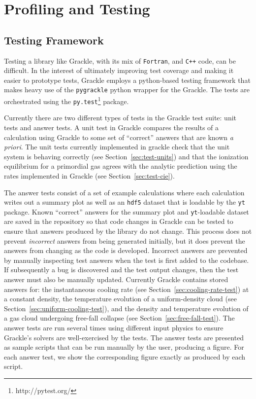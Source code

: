 \section{Profiling and Testing}
\label{sec:profiling-and-testing}



\subsection{Testing Framework}
\label{sec:testing}

Testing a library like Grackle, with its mix of \texttt{Fortran}, and
\texttt{C++} code, can be difficult. In the interest of ultimately improving
test coverage and making it easier to prototype tests, Grackle employs a
python-based testing framework that makes heavy use of the \texttt{pygrackle}
python wrapper for the Grackle. The tests are orchestrated using the
\texttt{py.test}\footnote{http://pytest.org/} package.

Currently there are two different types of tests in the Grackle test suite: unit
tests and answer tests. A unit test in Grackle compares the results of a
calculation using Grackle to some set of ``correct'' answers that are known
\textit{a priori}. The unit tests currently implemented in grackle check that the
unit system is behaving correctly (see Section~\ref{sec:test-units}) and that the
ionization equilibrium for a primordial gas agrees with the analytic prediction
using the rates implemented in Grackle (see Section~\ref{sec:test-cie}).

The answer tests consist of a set of example calculations where each calculation
writes out a summary plot as well as an \texttt{hdf5} dataset that is loadable
by the \texttt{yt} package. Known ``correct'' answers for the summary plot and
\texttt{yt}-loadable dataset are saved in the repository so that code changes in
Grackle can be tested to ensure that answers produced by the library do not
change. This process does not prevent \textit{incorrect} answers from being
generated initially, but it does prevent the answers from changing as the code
is developed. Incorrect answers are prevented by manually inspecting test
answers when the test is first added to the codebase. If subsequently a bug is
discovered and the test output changes, then the test answer must also be
manually updated. Currently Grackle contains stored answers for: the
instantaneous cooling rate (see Section~\ref{sec:cooling-rate-test})
at a constant density, the temperature evolution of a uniform-density cloud (see
Section~\ref{sec:uniform-cooling-test}), and the density and
temperature evolution of a gas cloud undergoing free-fall collapse
(see Section~\ref{sec:free-fall-test}). The answer tests are run
several times using different input physics to ensure Grackle's
solvers are well-exercised by the tests.  The answer tests are
presented as sample scripts that can be run manually by the user,
producing a figure.  For each answer test, we show the corresponding
figure exactly as produced by each script.

